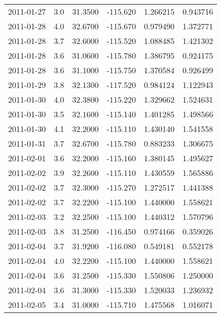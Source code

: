 \begin{tabular}{lrrrrr}
2011-01-27 &       3.0 &  31.3500 &  -115.620 &         1.266215 &         0.943716 \\
2011-01-28 &       4.0 &  32.6700 &  -115.670 &         0.979490 &         1.372771 \\
2011-01-28 &       3.7 &  32.6000 &  -115.520 &         1.088485 &         1.421302 \\
2011-01-28 &       3.6 &  31.0600 &  -115.780 &         1.386795 &         0.924175 \\
2011-01-28 &       3.6 &  31.1000 &  -115.750 &         1.370584 &         0.926499 \\
2011-01-29 &       3.8 &  32.1300 &  -117.520 &         0.984124 &         1.122943 \\
2011-01-30 &       4.0 &  32.3800 &  -115.220 &         1.329662 &         1.524631 \\
2011-01-30 &       3.5 &  32.1600 &  -115.140 &         1.401285 &         1.498566 \\
2011-01-30 &       4.1 &  32.2000 &  -115.110 &         1.430140 &         1.541558 \\
2011-01-31 &       3.7 &  32.6700 &  -115.780 &         0.883233 &         1.306675 \\
2011-02-01 &       3.6 &  32.2000 &  -115.160 &         1.380145 &         1.495627 \\
2011-02-02 &       3.9 &  32.2600 &  -115.110 &         1.430559 &         1.565886 \\
2011-02-02 &       3.7 &  32.3000 &  -115.270 &         1.272517 &         1.441388 \\
2011-02-02 &       3.7 &  32.2200 &  -115.100 &         1.440000 &         1.558621 \\
2011-02-03 &       3.2 &  32.2500 &  -115.100 &         1.440312 &         1.570796 \\
2011-02-03 &       3.8 &  31.2500 &  -116.450 &         0.974166 &         0.359026 \\
2011-02-04 &       3.7 &  31.9200 &  -116.080 &         0.549181 &         0.552178 \\
2011-02-04 &       4.0 &  32.2200 &  -115.100 &         1.440000 &         1.558621 \\
2011-02-04 &       3.6 &  31.2500 &  -115.330 &         1.550806 &         1.250000 \\
2011-02-04 &       3.6 &  31.3000 &  -115.330 &         1.520033 &         1.236932 \\
2011-02-05 &       3.4 &  31.0000 &  -115.710 &         1.475568 &         1.016071 \\

\end{tabular}
